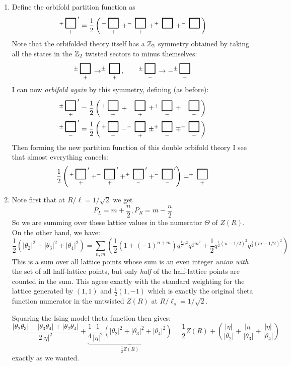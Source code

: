\documentclass[11pt]{article}
\begin{document}
\begin{enumerate}
	\item Define the orbifold partition function as
	\[
		^+\underset{+}{\BoxPlz}' = \frac12 \left( \,^+\underset{+}{\BoxPlz} + ^-\underset{+}{\BoxPlz} + ^+\underset{-}{\BoxPlz} + ^-\underset{-}{\BoxPlz} \right)
	\]
	Note that the orbifolded theory itself has a $\mathbb{Z}_2$ symmetry obtained by taking all the states in the $\mathbb{Z}_2$ twisted sectors to minus themselves:
	\[
		^\pm\underset{+}{\BoxPlz} \to ^\pm\underset{+}{\BoxPlz}, \qquad ^\pm\underset{-}{\BoxPlz} \to - ^\pm\underset{-}{\BoxPlz}
	\]
	I can now \emph{orbifold again} by this symmetry, defining (as before):
	\[
	\begin{aligned}
		&^\pm\underset{+}{\BoxPlz}' = \frac12 \left( \,^+\underset{+}{\BoxPlz} + ^-\underset{+}{\BoxPlz} \pm ^+\underset{-}{\BoxPlz} \pm ^-\underset{-}{\BoxPlz} \right)\\
		& ^\pm\underset{-}{\BoxPlz}' = \frac12 \left( \,^+\underset{+}{\BoxPlz} - ^-\underset{+}{\BoxPlz} \pm ^+\underset{-}{\BoxPlz} \mp ^-\underset{-}{\BoxPlz} \right)
	\end{aligned}
	\]
	Then forming the new partition function of this double orbifold theory I see that almost everything cancels:
	\[
		\frac12 \left( \,^+\underset{+}{\BoxPlz}' + ^-\underset{+}{\BoxPlz}' + ^+\underset{-}{\BoxPlz}' + ^-\underset{-}{\BoxPlz}' \right) = ^+\underset{+}{\BoxPlz}
	\]
	\item Note first that at $R/\ell = 1/\sqrt{2}$ we get \[
		P_L = m + \frac{n}{2}, P_R = m - \frac{n}{2}
	\]
	So we are summing over these lattice values in the numerator $\Theta$ of $Z(R)$. On the other hand, we have:
	\[
		\frac12(|\theta_2|^2 + |\theta_3|^2 + |\theta_4|^2) = \sum_{n, m} \left( \frac12 (1 + (-1)^{n+m}) q^{\frac12 n^2} \bar q^{\frac12 m^2} + \frac12 q^{\frac12 (n-1/2)^2} \bar q^{\frac12 (m-1/2)^2}  \right)
	\]
	This is a sum over all lattice points whose sum is an even integer \emph{union with} the set of all half-lattice points, but only \emph{half} of the half-lattice points are counted in the sum. This agree exactly with the standard weighting for the lattice generated by $(1, 1)$ and $\frac12 (1, -1)$ which is exactly the original theta function numerator in the untwisted $Z(R)$ at $R/\ell_s = 1/\sqrt{2}$. 
	
	Squaring the Ising model theta function then gives:
	\[
		\frac{|\theta_2 \theta_3| + |\theta_3 \theta_4| + |\theta_2 \theta_4|}{2|\eta|^2} + \underbrace{\frac14 \frac{1}{|\eta|^2}(|\theta_2|^2 + |\theta_3|^2 + |\theta_4|^2)}_{\frac12 Z(R)} = \frac12 Z(R) + \left(\frac{|\eta|}{|\theta_2|} + \frac{|\eta|}{|\theta_3|} + \frac{|\eta|}{|\theta_4|} \right)
	\]
	exactly as we wanted. 
	


\end{enumerate}
\end{document}
